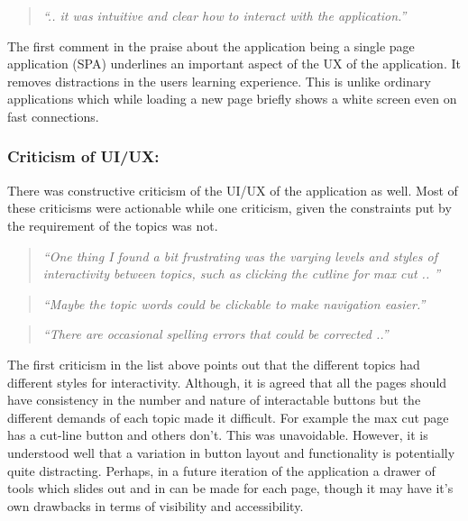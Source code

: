 \vspace{0.06 in}
\begin{quote}
\emph{``.. it was intuitive and clear how to
interact with the application.''}
\end{quote}


The first comment in the praise about the application being a single page
application (SPA) underlines an important aspect of the UX of the application.
It removes distractions in the users learning experience. This is unlike
ordinary applications which while loading a new page briefly shows a white
screen even on fast connections.


\subsubsection{Criticism of UI/UX:}
There was constructive criticism of the UI/UX of the application as well.
Most of these criticisms were actionable while one criticism, given the
constraints put by the requirement of the topics was not.

\begin{quote}
\emph{``One thing I found a bit frustrating was the varying levels and styles of
interactivity between topics, such as clicking the cutline for max cut .. ''}
\end{quote}

\vspace{0.06 in}

\begin{quote}
\emph{``Maybe the topic words could be clickable to make navigation easier.''}
\end{quote}

\vspace{0.06 in}
\begin{quote}
\emph{``There are occasional spelling errors that
   could be corrected ..'' }
\end{quote}

The first criticism in the list above points out that the different topics had
different styles for interactivity.  Although, it is agreed that all the pages
should have consistency in the number and nature of interactable buttons
but the different demands of each topic made it difficult.  For example the max
cut page has a cut-line button and others don't. This was unavoidable.
However, it is understood well that a variation in button layout and
functionality is potentially quite distracting. Perhaps, in a future iteration
of the application a drawer of tools which slides out and in can be made for
each page, though it may have it's own drawbacks in terms of visibility and
accessibility.

